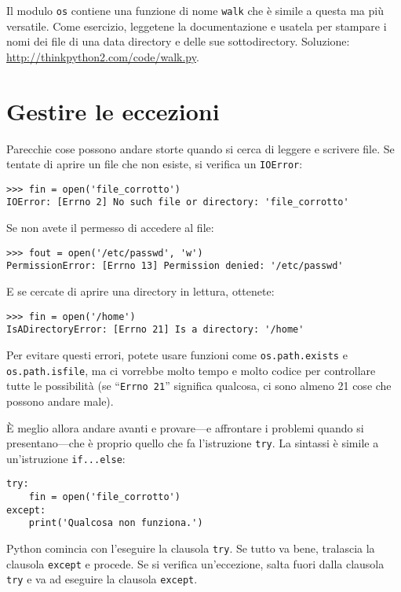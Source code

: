 \documentclass[10pt]{book}
\begin{document}
Il modulo {\tt os} contiene una funzione di nome {\tt walk}
che è simile a questa ma più versatile. Come esercizio, leggetene la documentazione e usatela per stampare i nomi dei file di una data directory e delle sue sottodirectory. Soluzione: \url{http://thinkpython2.com/code/walk.py}.


\section{Gestire le eccezioni}
\label{catch}

Parecchie cose possono andare storte quando si cerca di leggere e scrivere file. Se tentate di aprire un file che non esiste, si verifica un
{\tt IOError}:

\begin{verbatim}
>>> fin = open('file_corrotto')
IOError: [Errno 2] No such file or directory: 'file_corrotto'
\end{verbatim}
%
Se non avete il permesso di accedere al file:

\begin{verbatim}
>>> fout = open('/etc/passwd', 'w')
PermissionError: [Errno 13] Permission denied: '/etc/passwd'
\end{verbatim}
%
E se cercate di aprire una directory in lettura, ottenete:

\begin{verbatim}
>>> fin = open('/home')
IsADirectoryError: [Errno 21] Is a directory: '/home'
\end{verbatim}
%
Per evitare questi errori, potete usare funzioni come {\tt os.path.exists}
e {\tt os.path.isfile}, ma ci vorrebbe molto tempo e molto codice per controllare tutte le possibilità (se ``{\tt Errno 21}'' significa qualcosa, ci sono almeno 21 cose che possono andare male).

È meglio allora andare avanti e provare---e affrontare i problemi quando si presentano---che è proprio quello che fa l'istruzione {\tt try}. La sintassi è simile a un'istruzione {\tt if...else}:

\begin{verbatim}
try:    
    fin = open('file_corrotto')
except:
    print('Qualcosa non funziona.')
\end{verbatim}
%
Python comincia con l'eseguire la clausola {\tt try}.  Se tutto va bene, tralascia la clausola {\tt except} e procede. Se si verifica un'eccezione, salta fuori dalla clausola {\tt try} e va ad eseguire la clausola {\tt except}.
\end{document}
